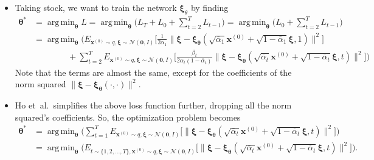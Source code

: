 \documentclass[10pt]{article}
\newcommand{\ve}[1]{\mathbf{#1}}
\newcommand{\ves}[1]{\boldsymbol{#1}}
\newcommand{\etal}{{et~al.}}
\newcommand{\mcal}[1]{\mathcal{#1}}
\DeclareMathOperator*{\argmin}{arg\,min}
\begin{document}
\begin{itemize}
  \item Taking stock, we want to train the network $\ves{\xi}_{\theta}$ by finding
  \begin{align*}
    \ves{\theta}^* 
    &= \argmin_{\ves{\theta}} L 
    = \argmin_{\ves{\theta}} \bigg( L_T + L_0 + \sum_{t=2}^{T} L_{t-1} \bigg) 
    = \argmin_{\ves{\theta}} \bigg( L_0 + \sum_{t=2}^{T} L_{t-1} \bigg) \\
    &= \argmin_{\ves{\theta}} \bigg( E_{\ve{x}^{(0)} \sim q, \ves{\xi} \sim \mcal{N}(\ve{0}, I)} \bigg[ \frac{1}{2\alpha_1} \Big\| \ves{\xi} - \ves{\xi}_{\ves{\theta}}(\sqrt{\overline{\alpha}_1}\ve{x}^{(0)} + \sqrt{1 - \overline{\alpha}_1} \ves{\xi}, 1 ) \Big\|^2 \bigg] \\
    &\qquad \qquad + \sum_{t=2}^{T} E_{\ve{x}^{(0)} \sim q, \ves{\xi} \sim \mcal{N}(\ve{0}, I)} \bigg[ \frac{\beta_t}{2 \alpha_t (1 - \overline{\alpha}_t)} \big\| \ves{\xi} - \ves{\xi}_{\ves{\theta}}(\sqrt{\overline{\alpha}_t}\ve{x}^{(0)} + \sqrt{1 - \overline{\alpha}_t}\ves{\xi},t) \big\|^2  \bigg] \bigg)
  \end{align*}
  Note that the terms are almost the same, except for the coefficients of the norm squared $\| \ves{\xi} - \ves{\xi}_{\ves{\theta}}(\cdot, \cdot) \|^2$.

  \item Ho \etal\ simplifies the above loss function further, dropping all the norm squared's coefficients. So, the optimization problem becomes
  \begin{align}
    \ves{\theta}^* 
    &= \argmin_{\ves{\theta}} \bigg( \sum_{t=1}^T E_{\ve{x}^{(0)} \sim q, \ves{\xi} \sim \mcal{N}(\ve{0}, I)} \Big[ \big\| \ves{\xi} - \ves{\xi}_{\ves{\theta}}(\sqrt{\overline{\alpha}_t}\ve{x}^{(0)} + \sqrt{1 - \overline{\alpha}_t}\ves{\xi}, t) \big\|^2 \Big] \bigg) \label{ddpm-noise-optimization-sum} \\
    &= \argmin_{\ves{\theta}} \bigg( E_{t \sim \{ 1, 2, \dotsc, T \}, \ve{x}^{(0)} \sim q, \ves{\xi} \sim \mcal{N}(\ve{0}, I)} \Big[ \big\| \ves{\xi} - \ves{\xi}_{\ves{\theta}}(\sqrt{\overline{\alpha}_t}\ve{x}^{(0)} + \sqrt{1 - \overline{\alpha}_t}\ves{\xi}, t) \big\|^2 \Big] \bigg). \label{ddpm-noise-optimization-sample}
  \end{align}


\end{itemize}
\end{document}
